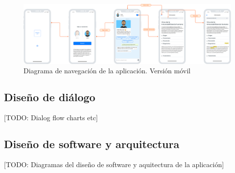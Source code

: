 \begin{figure}[htbp]
\centering
\includegraphics[scale=0.1]{../images/mobile_flow.png} 
\caption{Diagrama de navegación de la aplicación. Versión móvil}
\label{fig:mobile flow}
\end{figure}

\subsection{Diseño de diálogo}
[TODO: Dialog flow charts etc]


\subsection{Diseño de software y arquitectura}
[TODO: Diagramas del diseño de software y aquitectura de la aplicación]
